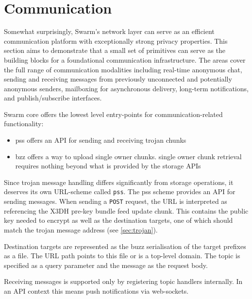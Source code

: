 \section{Communication \statusred}\label{sec:messaging}


Somewhat surprisingly, Swarm's network layer can serve as  an efficient  communication platform with exceptionally strong privacy properties. This section aims to demonstrate that a small set of primitives can serve as the building blocks for a foundational communication infrastructure. The areas cover the full range of communication modalities including real-time anonymous chat, sending and receiving messages from previously  unconnected and potentially anonymous senders, mailboxing for asynchronous delivery, long-term notifications, and  publish/subscribe interfaces. 

Swarm core offers the lowest level entry-points for communication-related functionality:

\begin{itemize}[noitemsep]
    \item pss offers an API for sending and receiving trojan chunks
    \item bzz offers a way to upload single owner chunks. single owner chunk retrieval requires nothing beyond what is provided by the storage APIs
\end{itemize}







Since trojan message handling differs significantly from storage operations, it deserves its  own URL-scheme called \lstinline{pss}. The pss scheme provides an API for sending messages. When sending a \lstinline{POST} request, the URL is interpreted as referencing the X3DH pre-key bundle feed update chunk. This contains the public key needed to encrypt as well as the destination targets,    one of which should match the trojan message address (see \ref{sec:trojan}). 

Destination targets are represented as the buzz serialisation of the target prefixes as a file. The URL path points to this file or is a top-level domain. The topic is specified as a query parameter and the message as the request body.

Receiving messages is supported only by registering topic handlers internally. In an API context this means push notifications via web-sockets.

